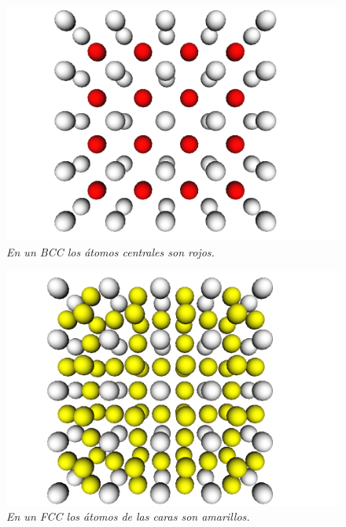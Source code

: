 \begin{figure}[ht]
  \centering
  \includegraphics[scale=.3]{images/atomCanvas-BCC}
  \caption{\em En un BCC los átomos centrales son rojos.}
  \label{atomCanvas-BCC}
\end{figure}

\begin{figure}[ht]
  \centering
  \includegraphics[scale=.35]{images/atomCanvas-FCC}
  \caption{\em En un FCC los átomos de las caras son amarillos.}
  \label{atomCanvas-FCC}
\end{figure}

